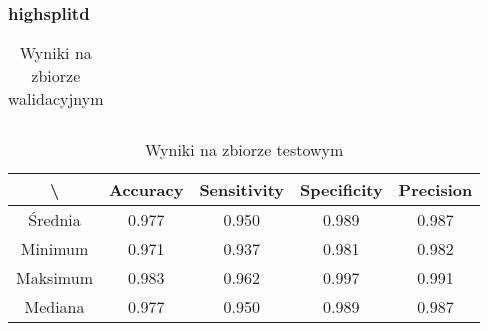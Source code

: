 \newpage
\subsubsection{highsplitd}

\begin{table}[!h]
	\centering
	\caption{Wyniki na zbiorze walidacyjnym}
	\vspace{6pt}
	{\footnotesize
		\begin{tabular}{|c|c|c|c|c|}
      \hline
		\end{tabular}
	}
	\vspace{0pt}
\end{table}

\begin{table}[!h]
	\centering
	\caption{Wyniki na zbiorze testowym}
	\vspace{6pt}
	{\footnotesize
		\begin{tabular}{|c|c|c|c|c|}
      \hline \textbackslash & Accuracy & Sensitivity & Specificity & Precision \\
      \hline Średnia & 0.977 & 0.950 & 0.989 & 0.987 \\
      \hline Minimum & 0.971 & 0.937 & 0.981 & 0.982 \\
      \hline Maksimum & 0.983 & 0.962 & 0.997 & 0.991 \\
      \hline Mediana & 0.977 & 0.950 & 0.989 & 0.987 \\
      \hline
		\end{tabular}
	}
	\vspace{0pt}
\end{table}

